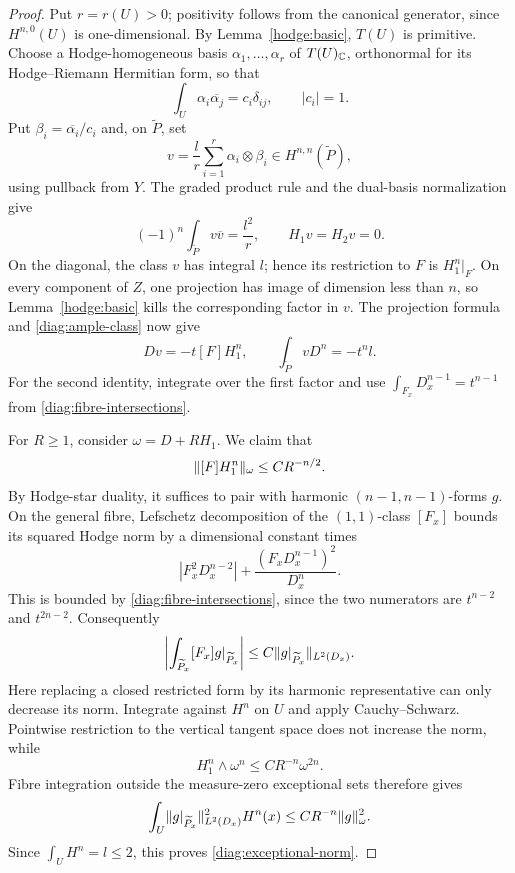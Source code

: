 \begin{proof}
Put $r=r(U)>0$; positivity follows from the canonical generator, since
$H^{n,0}(U)$ is one-dimensional.  By Lemma~\ref{hodge:basic}, $T(U)$
is primitive.  Choose a Hodge-homogeneous basis $\alpha_1,\ldots,\alpha_r$
of $T(U)_\mathbb C$, orthonormal for its Hodge--Riemann Hermitian form, so that
\[
 \int_U\alpha_i\overline{\alpha_j}=c_i\delta_{ij},
 \qquad |c_i|=1.
\]
Put $\beta_i=\overline{\alpha_i}/c_i$ and, on $\widetilde P$, set
\[
 v=\frac lr\sum_{i=1}^r\alpha_i\otimes\beta_i\in H^{n,n}(\widetilde P),
\]
using pullback from $Y$.  The graded product rule and the dual-basis
normalization give
\begin{equation}\label{diag:self-pairing}
 (-1)^n\int_{\widetilde P}v\overline v=\frac{l^2}{r},
 \qquad H_1v=H_2v=0.
\end{equation}
On the diagonal, the class $v$ has integral $l$; hence its restriction
to $F$ is $H_1^n|_F$.  On every component of $Z$, one projection has
image of dimension less than $n$, so Lemma~\ref{hodge:basic} kills the
corresponding factor in $v$.  The projection formula and
\eqref{diag:ample-class} now give
\begin{equation}\label{diag:intersection}
 Dv=-t[F]H_1^n,
 \qquad
 \int_{\widetilde P}vD^n=-t^n l.
\end{equation}
For the second identity, integrate over the first factor and use
$\int_{F_x}D_x^{n-1}=t^{n-1}$ from
\eqref{diag:fibre-intersections}.

For $R\ge1$, consider $\omega=D+RH_1$.  We claim that
\begin{equation}\label{diag:exceptional-norm}
 \lVert[F]H_1^n\rVert_\omega\le C R^{-n/2}.
\end{equation}
By Hodge-star duality, it suffices to pair with harmonic
$(n-1,n-1)$-forms $g$.  On the general fibre, Lefschetz decomposition
of the $(1,1)$-class $[F_x]$ bounds its squared Hodge norm by a
dimensional constant times
\[
 |F_x^2D_x^{n-2}|+
 \frac{(F_xD_x^{n-1})^2}{D_x^n}.
\]
This is bounded by \eqref{diag:fibre-intersections}, since the two
numerators are $t^{n-2}$ and $t^{2n-2}$.  Consequently
\[
 \left|\int_{\widetilde P_x}[F_x]g|_{\widetilde P_x}\right|
 \le C\lVert g|_{\widetilde P_x}\rVert_{L^2(D_x)}.
\]
Here replacing a closed restricted form by its harmonic representative
can only decrease its norm.  Integrate against $H^n$ on $U$ and apply
Cauchy--Schwarz.  Pointwise restriction to the vertical tangent space
does not increase the norm, while
\[
 H_1^n\wedge\omega^n\le C R^{-n}\omega^{2n}.
\]
Fibre integration outside the measure-zero exceptional sets therefore
gives
\[
 \int_U\lVert g|_{\widetilde P_x}\rVert_{L^2(D_x)}^2H^n(x)
 \le C R^{-n}\lVert g\rVert_\omega^2.
\]
Since $\int_UH^n=l\le2$, this proves
\eqref{diag:exceptional-norm}.


\end{proof}

